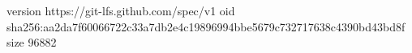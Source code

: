 version https://git-lfs.github.com/spec/v1
oid sha256:aa2da7f60066722c33a7db2e4c19896994bbe5679c732717638c4390bd43bd8f
size 96882
